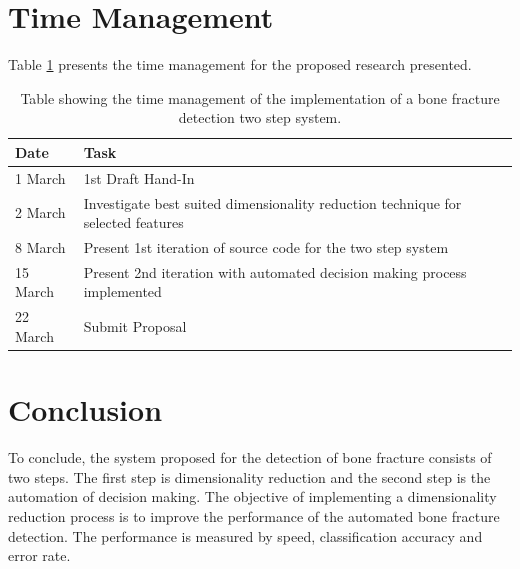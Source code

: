 \documentclass[11pt,twocolumn]{witseiepaper}
\begin{document}
	\section{Time Management}
	Table \ref{time_management} presents the time management for the proposed research presented. 
	\begin{table}[!h]
		\centering
		\caption{Table showing the time management of the implementation of a bone fracture detection two step system.}
		\label{time_management}
		\begin{tabular}{|l|p{5cm}|}
			\hline
			Date & Task \\
			\hline \hline
			1 March & 1st Draft Hand-In \\
			\hline
			2 March & Investigate best suited dimensionality reduction technique for selected features \\
			\hline
			8 March & Present 1st iteration of source code for the two step system \\
			\hline
			15 March & Present 2nd iteration with automated decision making process implemented \\
			\hline
			22 March & Submit Proposal \\
			\hline
		\end{tabular}
	\end{table}
	
	\section{Conclusion}
	To conclude, the system proposed for the detection of bone fracture consists of two steps. The first step is dimensionality reduction and the second step is the automation of decision making. The objective of implementing a dimensionality reduction process is to improve the performance of the automated bone fracture detection. The performance is measured by speed, classification accuracy and error rate. 
	
	\newpage
	
	
	
\end{document}
